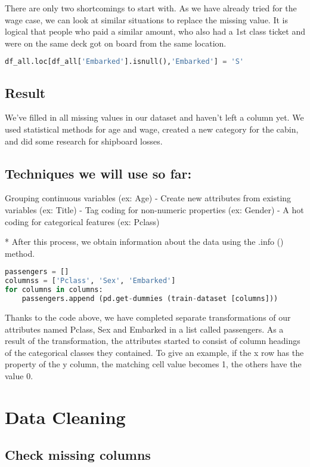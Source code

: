 \documentclass[onecolumn]{article}
\begin{document}
There are only two shortcomings to start with. As we have already tried for the wage case, we can look at similar situations to replace the missing value. It is logical that people who paid a similar amount, who also had a 1st class ticket and were on the same deck got on board from the same location.

\begin{lstlisting}[language=Python, caption=  embarked ] 
df_all.loc[df_all['Embarked'].isnull(),'Embarked'] = 'S'
\end{lstlisting}


\subsection{Result}

We've filled in all missing values ​​in our dataset and haven't left a column yet. We used statistical methods for age and wage, created a new category for the cabin, and did some research for shipboard losses.\\
\subsection{Techniques we will use so far:}
Grouping continuous variables (ex: Age)
- Create new attributes from existing variables (ex: Title)
- Tag coding for non-numeric properties (ex: Gender)
- A hot coding for categorical features (ex: Pclass)

* After this process, we obtain information about the data using the .info () method.
\begin{lstlisting}[language=Python, caption= get-dummies] 
passengers = []
columnss = ['Pclass', 'Sex', 'Embarked'] 
for columns in columns:
	passengers.append (pd.get-dummies (train-dataset [columns])) 
    \end{lstlisting}

Thanks to the code above, we have completed separate transformations of our attributes named Pclass, Sex and Embarked in a list called passengers. As a result of the transformation, the attributes started to consist of column headings of the categorical classes they contained. To give an example, if the x row has the property of the y column, the matching cell value becomes 1, the others have the value 0.
\section{Data Cleaning}

\subsection{Check missing columns}
\end{document}
